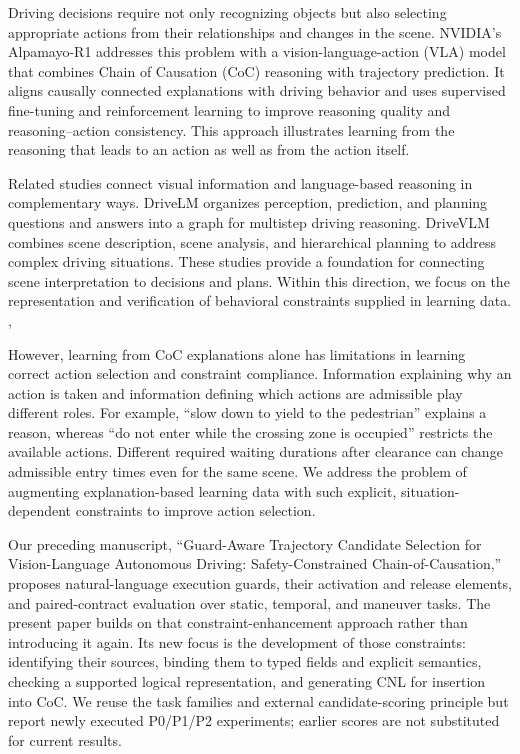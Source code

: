 \documentclass[nolineno]{ieeeaccess}
\begin{document}
Driving decisions require not only recognizing objects but also selecting appropriate actions from their relationships and changes in the scene. NVIDIA's Alpamayo-R1 addresses this problem with a vision-language-action (VLA) model that combines Chain of Causation (CoC) reasoning with trajectory prediction. It aligns causally connected explanations with driving behavior and uses supervised fine-tuning and reinforcement learning to improve reasoning quality and reasoning--action consistency. This approach illustrates learning from the reasoning that leads to an action as well as from the action itself. \cite{r1}\par

Related studies connect visual information and language-based reasoning in complementary ways. DriveLM organizes perception, prediction, and planning questions and answers into a graph for multistep driving reasoning. DriveVLM combines scene description, scene analysis, and hierarchical planning to address complex driving situations. These studies provide a foundation for connecting scene interpretation to decisions and plans. Within this direction, we focus on the representation and verification of behavioral constraints supplied in learning data. \cite{r2}, \cite{r3}\par

However, learning from CoC explanations alone has limitations in learning correct action selection and constraint compliance. Information explaining why an action is taken and information defining which actions are admissible play different roles. For example, “slow down to yield to the pedestrian” explains a reason, whereas “do not enter while the crossing zone is occupied” restricts the available actions. Different required waiting durations after clearance can change admissible entry times even for the same scene. We address the problem of augmenting explanation-based learning data with such explicit, situation-dependent constraints to improve action selection.\par

Our preceding manuscript, “Guard-Aware Trajectory Candidate Selection for Vision-Language Autonomous Driving: Safety-Constrained Chain-of-Causation,” proposes natural-language execution guards, their activation and release elements, and paired-contract evaluation over static, temporal, and maneuver tasks. The present paper builds on that constraint-enhancement approach rather than introducing it again. Its new focus is the development of those constraints: identifying their sources, binding them to typed fields and explicit semantics, checking a supported logical representation, and generating CNL for insertion into CoC. We reuse the task families and external candidate-scoring principle but report newly executed P0/P1/P2 experiments; earlier scores are not substituted for current results. \cite{r4}\par
\end{document}
